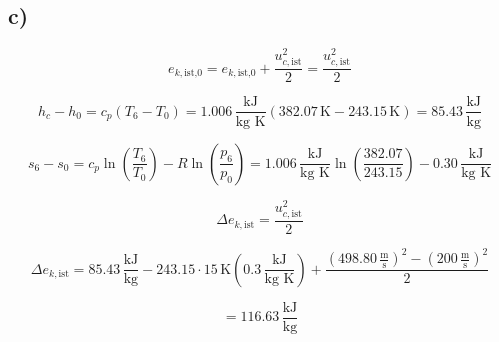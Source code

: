 

\subsection*{c)}

\[
e_{k, \text{ist,0}} = e_{k, \text{ist,0}} + \frac{u_{c, \text{ist}}^2}{2} = \frac{u_{c, \text{ist}}^2}{2}
\]

\[
h_c - h_0 = c_p (T_6 - T_0) = 1.006 \, \frac{\text{kJ}}{\text{kg K}} (382.07 \, \text{K} - 243.15 \, \text{K}) = 85.43 \, \frac{\text{kJ}}{\text{kg}}
\]

\[
s_6 - s_0 = c_p \ln \left( \frac{T_6}{T_0} \right) - R \ln \left( \frac{p_6}{p_0} \right) = 1.006 \, \frac{\text{kJ}}{\text{kg K}} \ln \left( \frac{382.07}{243.15} \right) - 0.30 \, \frac{\text{kJ}}{\text{kg K}}
\]

\[
\Delta e_{k, \text{ist}} = \frac{u_{c, \text{ist}}^2}{2}
\]

\[
\Delta e_{k, \text{ist}} = 85.43 \, \frac{\text{kJ}}{\text{kg}} - 243.15 \cdot 15 \, \text{K} (0.3 \, \frac{\text{kJ}}{\text{kg K}}) + \frac{(498.80 \, \frac{\text{m}}{\text{s}})^2 - (200 \, \frac{\text{m}}{\text{s}})^2}{2}
\]

\[
= 116.63 \, \frac{\text{kJ}}{\text{kg}}
\]
